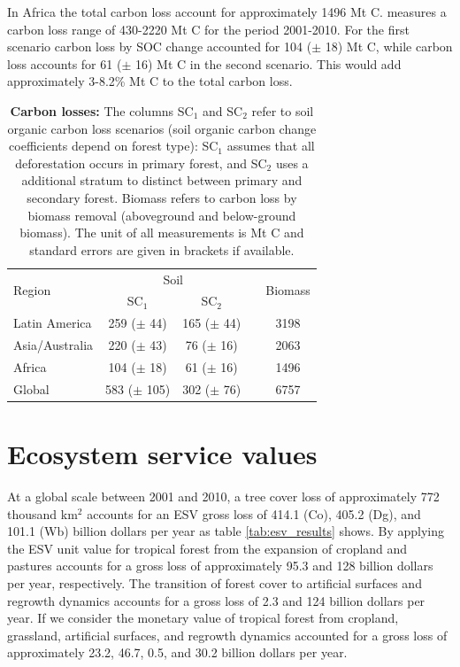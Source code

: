		In Africa the total carbon loss account for approximately 1496 Mt C. \citet{Achard2014} measures a carbon loss range of 430-2220 Mt C for the period 2001-2010. For the first scenario carbon loss by \ac{SOC} change accounted for 104 ($\pm$ 18) Mt C, while carbon loss accounts for 61 ($\pm$ 16) Mt C in the second scenario. This would add approximately 3-8.2\% Mt C to the total carbon loss.
		\begin{table}[ht]
			\centering
			\caption[Carbon losses]{\textbf{Carbon losses:} The columns SC$_1$ and SC$_2$ refer to soil organic carbon loss scenarios (soil organic carbon change coefficients depend on forest type): SC$_1$ assumes that all deforestation occurs in primary forest, and SC$_2$ uses a additional stratum to distinct between primary and secondary forest. Biomass refers to carbon loss by biomass removal (aboveground and below-ground biomass). The unit of all measurements is Mt C and standard errors are given in brackets if available.}
			\label{tab:soce_tab}
			\begin{tabular}{lccrc}
				\hline
				\multirow{2}{*}{Region}& \multicolumn{2}{c}{Soil} && \multirow{2}{*}{Biomass} \\\cline{2-3}
				& SC$_1$ & SC$_2$ && \\\hline
				Latin America & 259 ($\pm$ 44) & 165 ($\pm$ 44) && 3198\\
				Asia/Australia & 220 ($\pm$ 43) & 76 ($\pm$ 16) && 2063\\
				Africa & 104 ($\pm$ 18) & 61 ($\pm$ 16) && 1496\\
				Global & 583 ($\pm$ 105) & 302 ($\pm$ 76) && 6757\\\hline
			\end{tabular}
		\end{table}

	\section{Ecosystem service values}
		At a global scale between 2001 and 2010, a tree cover loss of approximately 772 thousand km$^2$ accounts for an \ac{ESV} gross loss of 414.1 (Co), 405.2 (Dg), and 101.1 (Wb) billion dollars per year as table \ref{tab:esv_results} shows. By applying the \ac{ESV} unit value for tropical forest from \citet{Costanza2014} the expansion of cropland and pastures accounts for a gross loss of approximately 95.3 and 128 billion dollars per year, respectively. The transition of forest cover to artificial surfaces and regrowth dynamics accounts for a gross loss of 2.3 and 124 billion dollars per year. If we consider the monetary value of tropical forest from \citet{Siikamaki2015} cropland, grassland, artificial surfaces, and regrowth dynamics accounted for a gross loss of approximately 23.2, 46.7, 0.5, and 30.2 billion dollars per year.

